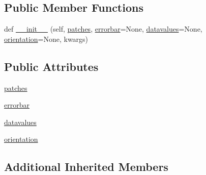 \subsection*{Public Member Functions}
\begin{DoxyCompactItemize}
\item 
def \hyperlink{classmatplotlib_1_1container_1_1BarContainer_a9604d76d1dfcdc6f38fad980ab65397a}{\+\_\+\+\_\+init\+\_\+\+\_\+} (self, \hyperlink{classmatplotlib_1_1container_1_1BarContainer_a215e86a592eeb0a02d722c64b41f773e}{patches}, \hyperlink{classmatplotlib_1_1container_1_1BarContainer_ad49c8d94917ddb6fd6499153089d3756}{errorbar}=None, \hyperlink{classmatplotlib_1_1container_1_1BarContainer_a87abb40038e1879f83495ae09e0ee6fc}{datavalues}=None, \hyperlink{classmatplotlib_1_1container_1_1BarContainer_a008a5c041544c6c2b857fc8449894696}{orientation}=None, kwargs)
\end{DoxyCompactItemize}
\subsection*{Public Attributes}
\begin{DoxyCompactItemize}
\item 
\hyperlink{classmatplotlib_1_1container_1_1BarContainer_a215e86a592eeb0a02d722c64b41f773e}{patches}
\item 
\hyperlink{classmatplotlib_1_1container_1_1BarContainer_ad49c8d94917ddb6fd6499153089d3756}{errorbar}
\item 
\hyperlink{classmatplotlib_1_1container_1_1BarContainer_a87abb40038e1879f83495ae09e0ee6fc}{datavalues}
\item 
\hyperlink{classmatplotlib_1_1container_1_1BarContainer_a008a5c041544c6c2b857fc8449894696}{orientation}
\end{DoxyCompactItemize}
\subsection*{Additional Inherited Members}


